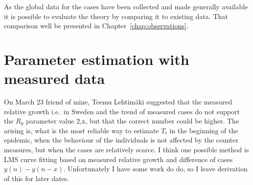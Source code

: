 As the global data for the cases have been collected and made generally
available it is possible to evaluate the theory by comparing it to
existing data. That comparison well be presented in Chapter~\ref{chap:observations}.

\section{Parameter estimation with measured data}
On March 23 friend of mine,  Teemu Lehtimäki suggested that the measured
relative growth i.e.\ in Sweden and the trend of measured cases do not support
the $R_0$ parameter value 2,x, but that the correct number could be higher. The
arising is, what is the most reliable way to estimate $T_t$ in the beginning
of the epidemic, when the behaviour of the individuals is not affected by the
counter measures, but when the cases are relatively scarce. I think one
possible 
method is LMS curve fitting based on measured relative growth and difference
of cases $y\left(n\right)-y\left(n-x\right)$. Unfortunately I
have some work do do, so I leave derivation of this for later dates.


